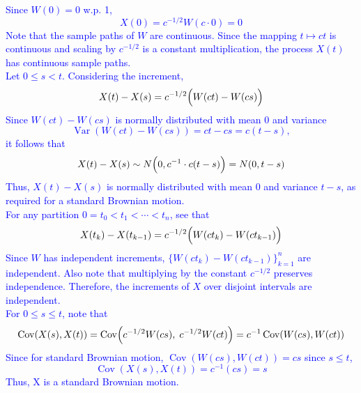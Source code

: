 \documentclass{article}
\begin{document}
%
%
%
%
%


\textcolor{blue}{
    \noindent Since $W(0)=0$ w.p. 1,
\[
X(0) = c^{-1/2} W(c\cdot 0)= 0
\]
\noindent Note that the sample paths of $W$ are continuous. Since the mapping 
$t\mapsto ct$
is continuous and scaling by $c^{-1/2}$ is a constant multiplication, the process $X(t)$ has continuous sample paths. \\
\noindent Let $0\leq s < t$. Considering the increment,
\[
X(t)-X(s)= c^{-1/2}\Bigl(W(ct)-W(cs)\Bigr)
\]
Since $W(ct)-W(cs)$ is normally distributed with mean $0$ and variance
\[
\operatorname{Var}(W(ct)-W(cs)) = ct-cs = c(t-s),
\]
it follows that
\[
X(t)-X(s) \sim N\Bigl(0, c^{-1} \cdot c(t-s)\Bigr) = N(0,t-s)
\]
Thus, $X(t)-X(s)$ is normally distributed with mean $0$ and variance $t-s$, as required for a standard Brownian motion. \\
\noindent For any partition $0=t_0<t_1<\cdots<t_n$, see that 
\[
X(t_k)-X(t_{k-1}) = c^{-1/2}\Bigl(W(ct_k)-W(ct_{k-1})\Bigr)
\]
Since $W$ has independent increments, $\{W(ct_k)-W(ct_{k-1})\}_{k=1}^n$ are independent. Also note that multiplying by the constant $c^{-1/2}$ preserves independence. Therefore, the increments of $X$ over disjoint intervals are independent. \\
\noindent For $0\le s\le t$, note that 
\[
\operatorname{Cov}(X(s),X(t)) = \operatorname{Cov}\Bigl(c^{-1/2}W(cs), \; c^{-1/2}W(ct)\Bigr)
= c^{-1}\operatorname{Cov}(W(cs),W(ct))
\]
Since for standard Brownian motion, $\operatorname{Cov}(W(cs),W(ct)) = cs$ since $s\le t$,
\[
\operatorname{Cov}(X(s),X(t)) = c^{-1}(cs)= s
\]
Thus, X is a standard Brownian motion.
}
\end{document}

